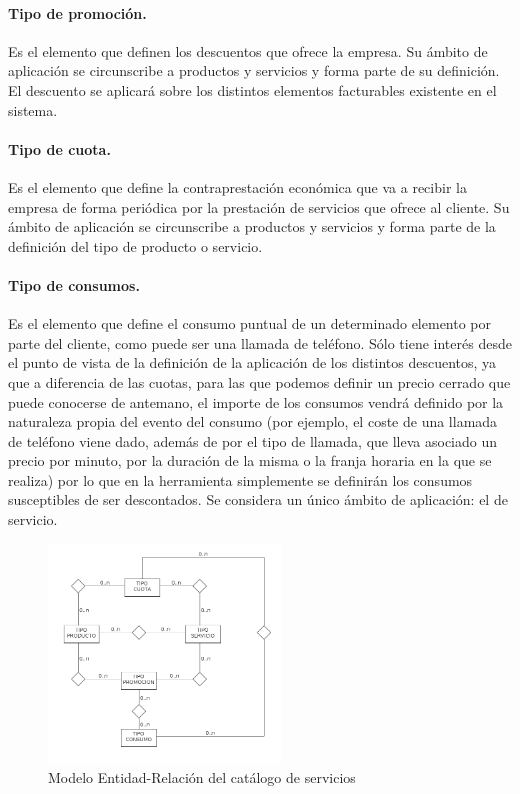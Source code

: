 \paragraph{Tipo de promoción.} Es el elemento que definen los descuentos que ofrece la empresa. Su ámbito de aplicación se circunscribe a productos y servicios y forma parte de su definición. El descuento se aplicará sobre los distintos elementos facturables existente en el sistema.
\paragraph{Tipo de cuota.} Es el elemento que define la contraprestación económica que va a recibir la empresa de forma periódica por la prestación de servicios que ofrece al cliente. Su ámbito de aplicación se circunscribe a productos y servicios y forma parte de la definición del tipo de producto o servicio.
\paragraph{Tipo de consumos.} Es el elemento que define el consumo puntual de un determinado elemento por parte del cliente, como puede ser una llamada de teléfono. Sólo tiene interés desde el punto de vista de la definición de la aplicación de los distintos descuentos, ya que a diferencia de las cuotas, para las que podemos definir un precio cerrado que puede conocerse de antemano, el importe de los consumos vendrá definido por la naturaleza propia del evento del consumo (por ejemplo, el coste de una llamada de teléfono viene dado, además de por el tipo de llamada, que lleva asociado un precio por minuto, por la duración de la misma o la franja horaria en la que se realiza) por lo que en la herramienta simplemente se definirán los consumos susceptibles de ser descontados. Se considera un único ámbito de aplicación: el de servicio.



\begin{figure}
  \centering
  \includegraphics[width=0.55\textwidth]{imaxes/catalogo.png}
  \caption{Modelo Entidad-Relación del catálogo de servicios}
  \label{fig:catalogo}
\end{figure}

